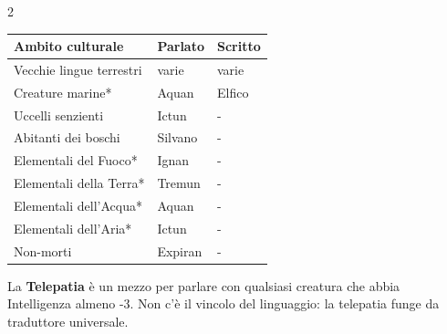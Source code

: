 \begin{multicols}{2}
{\noindent\begin{tabularx}{\linewidth}{lXX}
		\toprule
\rowcolor{gray!20}\textbf{Ambito culturale}& \textbf{Parlato} & \textbf{Scritto}\\
\toprule
Vecchie lingue terrestri& varie & varie\\
\rowcolor{gray!20}Creature marine* & Aquan& Elfico\\
Uccelli senzienti& Ictun & -\\
\rowcolor{gray!20}Abitanti dei boschi& Silvano& - \\
Elementali del Fuoco* & Ignan&-\\
\rowcolor{gray!20}Elementali della Terra*& Tremun &-\\
Elementali dell'Acqua* & Aquan & - \\
\rowcolor{gray!20}Elementali dell'Aria*& Ictun &-\\
Non-morti & Expiran & - \\
\end{tabularx}}

\medskip

La \textbf{Telepatia} è un mezzo per parlare con qualsiasi creatura che abbia Intelligenza almeno -3. Non c'è il vincolo del linguaggio: la telepatia funge da traduttore universale.

%


\end{multicols}

\pagebreak


